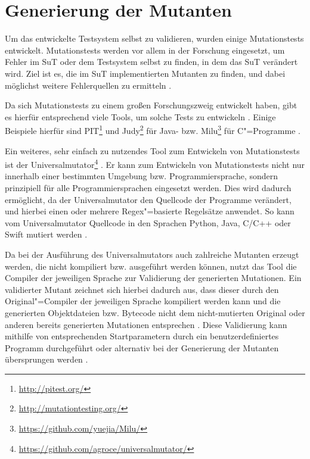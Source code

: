 \section{Generierung der Mutanten}
\label{sec:implMutationTests}

Um das entwickelte Testsystem selbst zu validieren, wurden einige Mutationstests entwickelt.
Mutationstests werden vor allem in der Forschung eingesetzt, um Fehler im \gls{SuT} oder dem Testsystem selbst zu finden, in dem das \gls{SuT} verändert wird.
Ziel ist es, die im \gls{SuT} implementierten Mutanten zu finden, und dabei möglichst weitere Fehlerquellen zu ermitteln \cite{DeMillo1978,Hamlet1977,Jia2011,Groce2018}.

Da sich Mutationstests zu einem großen Forschungszweig entwickelt haben, gibt es hierfür entsprechend viele Tools, um solche Tests zu entwickeln \cite{Jia2011,Groce2018}.
Einige Beispiele hierfür sind PIT\footnote{\url{http://pitest.org/}} und Judy\footnote{\url{http://mutationtesting.org/}} für Java- bzw. Milu\footnote{\url{https://github.com/yuejia/Milu/}} für C"=Programme \cite{Coles2016,Madeyski2010,Jia2008}.

Ein weiteres, sehr einfach zu nutzendes Tool zum Entwickeln von Mutationstests ist der Universalmutator\footnote{\url{https://github.com/agroce/universalmutator/}} \cite{Groce2018}.
Er kann zum Entwickeln von Mutationstests nicht nur innerhalb einer bestimmten Umgebung bzw. Programmiersprache, sondern prinzipiell für alle Programmiersprachen eingesetzt werden.
Dies wird dadurch ermöglicht, da der Universalmutator den Quellcode der Programme verändert, und hierbei einen oder mehrere \gls{Regex}"=basierte Regelsätze anwendet.
So kann vom Universalmutator Quellcode \uA in den Sprachen Python, Java, C/C++ oder Swift mutiert werden \cite{Groce2018}.

Da bei der Ausführung des Universalmutators auch zahlreiche Mutanten erzeugt werden, die nicht kompiliert bzw. ausgeführt werden können, nutzt das Tool die Compiler der jeweiligen Sprache zur Validierung der generierten Mutationen.
Ein validierter Mutant zeichnet sich hierbei dadurch aus, dass dieser durch den Original"=Compiler der jeweiligen Sprache kompiliert werden kann und die generierten Objektdateien bzw. Bytecode nicht dem nicht-mutierten Original oder anderen bereits generierten Mutationen entsprechen \cite{Groce2018}.
Diese Validierung kann mithilfe von entsprechenden Startparametern durch ein benutzerdefiniertes Programm durchgeführt oder alternativ bei der Generierung der Mutanten übersprungen werden \cite{Groce2018,UniversalmutatorSourceGenmutants}.


